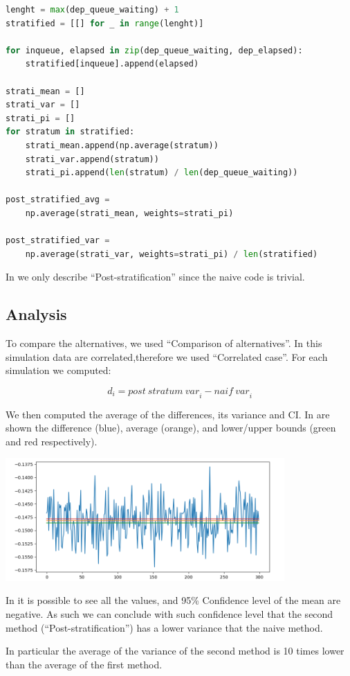 \documentclass[10pt,a4paper]{article}
\begin{document}
\begin{lstlisting}[language=python,caption={Post-stratification pseudo-code},captionpos=b,label={lst:post-stratififcation}]
lenght = max(dep_queue_waiting) + 1
stratified = [[] for _ in range(lenght)]

for inqueue, elapsed in zip(dep_queue_waiting, dep_elapsed):
    stratified[inqueue].append(elapsed)

strati_mean = []
strati_var = []
strati_pi = []
for stratum in stratified:
    strati_mean.append(np.average(stratum))
    strati_var.append(stratum))
    strati_pi.append(len(stratum) / len(dep_queue_waiting))

post_stratified_avg = 
    np.average(strati_mean, weights=strati_pi)

post_stratified_var =
    np.average(strati_var, weights=strati_pi) / len(stratified)
\end{lstlisting}

In  we only describe ``Post-stratification'' since the naive code is trivial.

\subsection*{Analysis}

To compare the alternatives, we used ``Comparison of alternatives''. In this simulation  data are correlated,therefore we used ``Correlated case''. For each simulation we computed:

\begin{equation*}
  \mathit{d}_i = \mathit{post\ stratum\ var}_i - \mathit{naif\ var}_i
\end{equation*}

We then computed the average of the differences, its variance and CI. In  are shown the difference (blue), average (orange), and lower/upper bounds (green and red respectively).

\begin{center}
  \includegraphics[width=0.8\textwidth]{post-stratification.png}
  \label{fig:post-stratification}
\end{center}

In  it is possible to see all the values, and 95\% Confidence level of the mean are negative. As such we can conclude with such confidence level that the second method (``Post-stratification'') has a lower variance that the naive method.

In particular the average of the variance of the second method is 10 times lower than the average of the first method.
\end{document}
